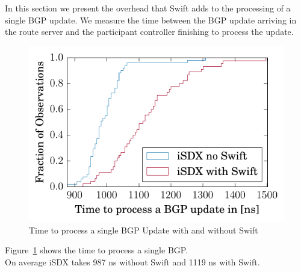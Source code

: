 In this section we present the overhead that Swift adds to the processing of a single BGP update. We measure the time between the BGP update arriving in the route server and the participant controller finishing to process the update. 

\begin{figure}[h]
\center
\includegraphics[scale = 1]{Figures/results_overhead.pdf}
\caption{Time to process a single BGP Update with and without Swift}
\label{fig:swiftoverhead}
\end{figure}

Figure~\ref{fig:swiftoverhead} shows the time to process a single BGP. \\On average iSDX takes 987 ns without Swift and 1119 ns with Swift.

\newpage